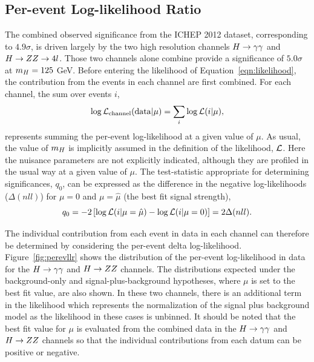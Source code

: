 \chapter{}
\section{Per-event Log-likelihood Ratio}
\label{app:pereventllr}
The combined observed significance from the ICHEP 2012 dataset, corresponding to $4.9\sigma$, 
is driven largely by the two high resolution channels $H\rightarrow\gamma\gamma$ and $H\rightarrow ZZ \rightarrow 4l$. Those two channels
alone combine provide a significance of $5.0\sigma$ at $m_{H}=125$ GeV. 
Before entering the likelihood of Equation~\ref{eqn:likelihood}, the contribution from the 
events in each channel are first combined. For each channel, the sum over events $i$,
\begin{equation}
\log \mathcal{L}_{\mathrm{channel}}(\mathrm{data}|\mu) = \sum_{i}\log\mathcal{L}(i|\mu),
\end{equation}
represents summing the per-event log-likelihood at a given value of $\mu$. As usual, the 
value of $m_{H}$ is implicitly assumed in the definition of the likelihood, $\mathcal{L}$.
Here the nuisance parameters are not explicitly indicated, although they are profiled in the usual way at a given value of $\mu$.
The test-statistic appropriate for 
determining significances, $q_{0}$, can be expressed as the difference in the negative 
log-likelihoods ($\Delta(nll)$) for $\mu=0$ and $\mu=\hat{\mu}$ (the best fit signal strength),
\begin{equation}
q_{0} = -2\left[\log\mathcal{L}(i|\mu=\hat{\mu}) - \log\mathcal{L}(i|\mu=0) \right]= 2\Delta(nll).
\end{equation}

The individual contribution from each event in data in each channel can therefore be determined
by considering the per-event delta log-likelihood. Figure~\ref{fig:perevllr} shows the distribution
of the per-event log-likelihood in data for the $H\rightarrow\gamma\gamma$ and $H\rightarrow ZZ$ channels.
The distributions expected under the background-only and signal-plus-background hypotheses, where 
$\mu$ is set to the best fit value, are also shown. 
In these two channels, there is an additional term in the likelihood which 
represents the normalization of the signal plus background model as the likelihood 
in these cases is unbinned. It should be noted that the 
best fit value for $\mu$ is evaluated from the combined data in the $H\rightarrow\gamma\gamma$ and $H\rightarrow ZZ$ 
channels so that the individual contributions from each datum can be positive or negative.


